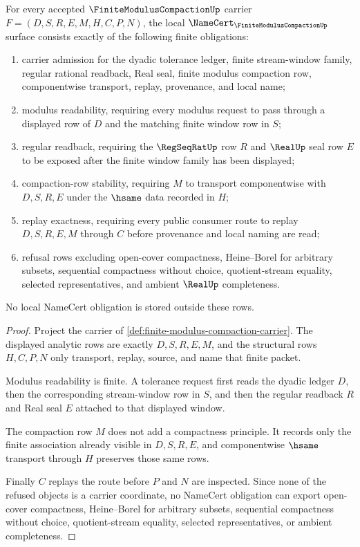 \begin{theorem}\label{thm:finite-modulus-compaction-namecert-obligations}
For every accepted $\FiniteModulusCompactionUp$ carrier
$F=(D,S,R,E,M,H,C,P,N)$, the local $\NameCert_{\FiniteModulusCompactionUp}$ surface consists exactly of the following finite obligations:
\begin{enumerate}
\item carrier admission for the dyadic tolerance ledger, finite stream-window family, regular rational readback, Real seal, finite modulus compaction row, componentwise transport, replay, provenance, and local name;
\item modulus readability, requiring every modulus request to pass through a displayed row of $D$ and the matching finite window row in $S$;
\item regular readback, requiring the $\RegSeqRatUp$ row $R$ and $\RealUp$ seal row $E$ to be exposed after the finite window family has been displayed;
\item compaction-row stability, requiring $M$ to transport componentwise with $D,S,R,E$ under the $\hsame$ data recorded in $H$;
\item replay exactness, requiring every public consumer route to replay $D,S,R,E,M$ through $C$ before provenance and local naming are read;
\item refusal rows excluding open-cover compactness, Heine--Borel for arbitrary subsets, sequential compactness without choice, quotient-stream equality, selected representatives, and ambient $\RealUp$ completeness.
\end{enumerate}
No local NameCert obligation is stored outside these rows.
\end{theorem}
\begin{proof}
Project the carrier of \autoref{def:finite-modulus-compaction-carrier}. The displayed analytic rows are exactly $D,S,R,E,M$, and the structural rows $H,C,P,N$ only transport, replay, source, and name that finite packet.

Modulus readability is finite. A tolerance request first reads the dyadic ledger $D$, then the corresponding stream-window row in $S$, and then the regular readback $R$ and Real seal $E$ attached to that displayed window.

The compaction row $M$ does not add a compactness principle. It records only the finite association already visible in $D,S,R,E$, and componentwise $\hsame$ transport through $H$ preserves those same rows.

Finally $C$ replays the route before $P$ and $N$ are inspected. Since none of the refused objects is a carrier coordinate, no NameCert obligation can export open-cover compactness, Heine--Borel for arbitrary subsets, sequential compactness without choice, quotient-stream equality, selected representatives, or ambient completeness.
\end{proof}

